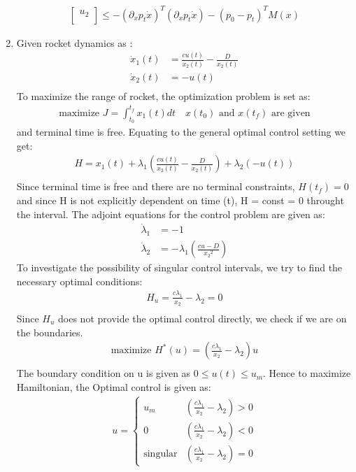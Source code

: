 \begin{enumerate}
\begin{align*}
\begin{bmatrix}
                   u_2 \\
                  \end{bmatrix} \le - (\partial_x p_t \dot x)^T (\partial_x p_t \dot x) - (p_0 - p_t)^T M(x)
  \end{align*}
\item Given rocket dynamics as :
\begin{align*}
 \dot x_1(t) &= \frac{cu(t)}{x_2(t)} - \frac{D}{x_2(t)} \\
 \dot x_2(t) &= - u(t) \\
\end{align*}
 To maximize the range of rocket, the optimization problem is set as:
 \begin{align*}
   \mbox{maximize }J = \int_{t_0}^{t_f} x_1(t) dt \quad x(t_0) \mbox{ and } x(t_f) \mbox{ are given}
 \end{align*}
 and terminal time is free. Equating to the general optimal control setting we get:
 \begin{align*}
  H = x_1(t) + \lambda_1( \frac{cu(t)}{x_2(t)} - \frac{D}{x_2(t)} ) + \lambda_2 ( - u(t)) \\
 \end{align*}
 Since terminal time is free and there are no terminal constraints, $H(t_f) = 0$ and since H is not explicitly dependent on time (t), H = const = 0 throught the interval.
 The adjoint equations for the control problem are given as:
 \begin{align*}
  \dot \lambda_1 &= - 1 \\
  \dot \lambda_2 &= -\lambda_1\left(\frac{cu - D}{{x_2}^2}\right)
 \end{align*}
 To investigate the possibility of singular control intervals, we try to find the necessary optimal conditions:
 \begin{align*}
  H_u = \frac{c \lambda_1}{x_2} - \lambda_2 = 0\\
 \end{align*}
 Since $H_u$ does not provide the optimal control directly, we check if we are on the boundaries.
 \begin{align*}
  \mbox{maximize }H^*(u) = \left(\frac{c \lambda_1}{x_2} - \lambda_2\right) u \\
 \end{align*}
 The boundary condition on u is given as $0 \le u(t) \le u_{m}$. Hence to maximize Hamiltonian, the Optimal control is given as:
 \begin{align*}
	      u =       \begin{cases}
                         u_m & \left(\frac{c \lambda_1}{x_2} - \lambda_2\right) > 0\\
                         0 & \left(\frac{c \lambda_1}{x_2} - \lambda_2\right)< 0\\
                         \mbox{singular} & \left(\frac{c \lambda_1}{x_2} - \lambda_2\right) = 0
                        \end{cases}\\ 
 \end{align*}
 

\end{enumerate}
